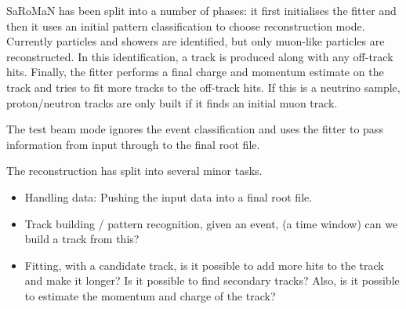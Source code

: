 SaRoMaN has been split into a number of phases: it first initialises the fitter and then it uses an initial pattern classification to choose reconstruction mode. Currently particles and showers are identified, but only muon-like particles are reconstructed. In this identification, a track is produced along with any off-track hits. Finally, the fitter performs a final charge and momentum estimate on the track and tries to fit more tracks to the off-track hits. If this is a neutrino sample, proton/neutron tracks are only built if it finds an initial muon track.

The test beam mode ignores the event classification and uses the fitter to pass information from input through to the final root file.

The reconstruction has split into several minor tasks.
\begin{itemize}
\item Handling data: Pushing the input data into a final root file.
\item Track building / pattern recognition, given an event, (a time window) can we build a track from this?
\item Fitting, with a candidate track, is it possible to add more hits to the track and make it longer? Is it possible to find secondary tracks? Also, is it possible to estimate the momentum and charge of the track?
\end{itemize}


